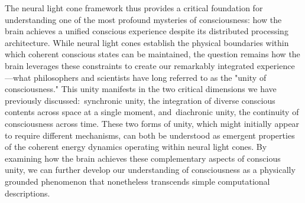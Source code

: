 The neural light cone framework thus provides a critical foundation for understanding one of the most profound mysteries of consciousness: how the brain achieves a unified conscious experience despite its distributed processing architecture. While neural light cones establish the physical boundaries within which coherent conscious states can be maintained, the question remains how the brain leverages these constraints to create our remarkably integrated experience—what philosophers and scientists have long referred to as the "unity of consciousness." This unity manifests in the two critical dimensions we have previously discussed:~synchronic unity, the integration of diverse conscious contents across space at a single moment, and~diachronic unity, the continuity of consciousness across time. These two forms of unity, which might initially appear to require different mechanisms, can both be understood as emergent properties of the coherent energy dynamics operating within neural light cones. By examining how the brain achieves these complementary aspects of conscious unity, we can further develop our understanding of consciousness as a physically grounded phenomenon that nonetheless transcends simple computational descriptions.
